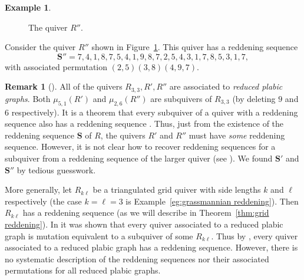 \documentclass[11pt, letterpaper]{amsart}
\theoremstyle{definition}
\newtheorem{remark}[theorem]{Remark}
\newtheorem{example}[theorem]{Example}
\numberwithin{equation}{section}
\begin{document}
\begin{example}
\label{eg:positroid reddening 2}
\begin{figure}[ht]
    \centering
    \caption{The quiver $R''$.}
    \label{fig:positroid reddening 2}
\end{figure}
Consider the quiver $R''$ shown in Figure~\ref{fig:positroid reddening 2}.
This quiver has a reddening sequence 
$$\mathbf S'' = 7, 4, 1, 8, 7, 5, 4, 1, 9, 8, 7, 2, 5, 4, 3, 1, 7, 8, 5, 3, 1, 7,$$ 
with associated permutation $ (2,5) (3,8) (4,9,7)$.
\end{example}

\begin{remark} [{\cite{MR3820364}}]
\label{rem:positroid green seqs}
All of the quivers $R_{3,3}, R', R''$ are associated to \emph{reduced plabic graphs}.
Both $\mu_{5,1}(R')$ and $\mu_{2,6}(R'')$ are subquivers of $R_{3,3}$ (by deleting $9$ and $6$ respectively).
It is a theorem that every subquiver of a quiver with a reddening sequence also has a reddening sequence \cite[Theorem~17]{MR3512669}. 
Thus, just from the existence of the reddening sequence $\mathbf S$ of $R$, the quivers $R'$ and $R''$ must have \emph{some} reddening sequence. 
However, it is not clear how to recover reddening sequences for a subquiver from a reddening sequence of the larger quiver (see 
\cite[Remark~35]{MR3512669}).
We found $\mathbf S'$ and $\mathbf S''$ by tedious guesswork.

More generally, let $R_{k\ell}$ be a triangulated grid quiver with side lengths $k$ and $\ell$ respectively (the case $k=\ell=3$ is Example~\ref{eg:grassmannian reddening}).
Then $R_{k\ell}$ has a reddening sequence (as we will describe in Theorem~\ref{thm:grid reddening}).
In \cite[Theorem~4.1]{MR3820364} it was shown that every quiver associated to a reduced plabic graph is mutation equivalent to a subquiver of some $R_{k\ell}$.
Thus by \cite[Theorem~17]{MR3512669}, every quiver associated to a reduced plabic graph has a reddening sequence.
However, there is no systematic description of the reddening sequences nor their associated permutations for all reduced plabic graphs. 
\end{remark}
\end{document}
